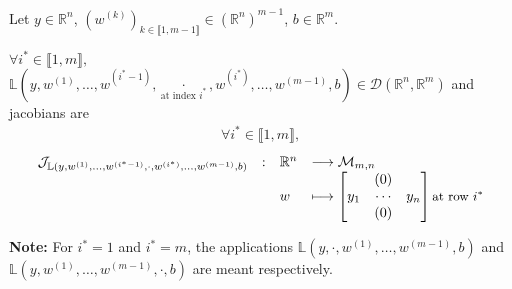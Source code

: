 \documentclass[11pt,en]{elegantpaper}
\newcommand{\Real}{\mathbb{R}}
\begin{document}
\begin{proposition}
  {\normalfont
    Let $y \in \Real^n$, $(w^{(k)})_{k \in \llbracket 1,m-1 \rrbracket} \in (\Real^n)^{m-1}$, $b \in \Real^m$. \par
    $\forall i^* \in \llbracket 1,m \rrbracket,$
    $\mathbb{L}(y,w^{(1)},\ldots,w^{(i^*-1)},\underset{\text{at index $i^*$}}{\cdot},w^{(i^*)},\ldots,w^{(m-1)},b) \in \mathcal{D}(\Real^n, \Real^m)$
    and jacobians are \begin{equation*}
      \begin{gathered}
        \forall i^* \in \llbracket 1,m \rrbracket,
      \end{gathered}
    \end{equation*}
    \begin{equation}\label{prop:densel_W_differential}
      \begin{array}{llll}
        \mathcal{J}_{\mathbb{L}(y,w^{(1)},\ldots,w^{(i^*-1)},\cdot,w^{(i^*)},\ldots,w^{(m-1)},b)} & : & \Real^n  & \longrightarrow \mathcal{M}_{m,n} \\
        &   & w & \longmapsto \begin{bmatrix}
          & (0) & \\
          y_1 & \cdots & y_n \\
          & (0) &
        \end{bmatrix} \text{\small{at row $i^*$}}
      \end{array}
    \end{equation} \par
    \textbf{Note:} For $i^*=1$ and $i^*=m$,
    the applications $\mathbb{L}(y,\cdot,w^{(1)},\ldots,w^{(m-1)},b)$ and $\mathbb{L}(y,w^{(1)},\ldots,w^{(m-1)},\cdot,b)$ are meant respectively.
  }
\end{proposition}
\end{document}
